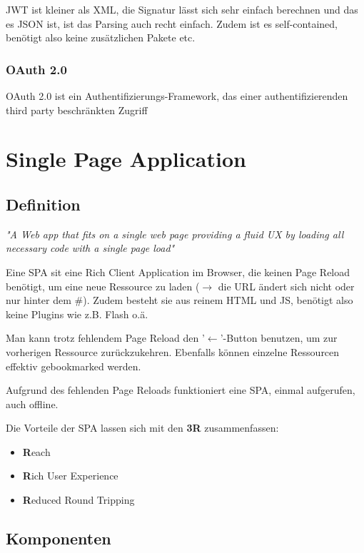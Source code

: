 \documentclass[a4paper, 11pt]{article}
\begin{document}
\vspace{10px}

\noindent JWT ist kleiner als XML, die Signatur lässt sich sehr einfach berechnen und das es JSON ist, ist das Parsing auch recht einfach. Zudem ist es self-contained, benötigt also keine zusätzlichen Pakete etc.

\subsubsection{OAuth 2.0}
OAuth 2.0 ist ein Authentifizierungs-Framework, das einer authentifizierenden third party beschränkten Zugriff 

\section{Single Page Application}
\subsection{Definition}
\begin{center}
	\textit{"A Web app that fits on a single web page providing a fluid UX by loading all necessary code with a single page load"}
\end{center}

\noindent Eine SPA sit eine Rich Client Application im Browser, die keinen Page Reload benötigt, um eine neue Ressource zu laden ($\rightarrow$ die URL ändert sich nicht oder nur hinter dem \#). Zudem besteht sie aus reinem HTML und JS, benötigt also keine Plugins wie z.B. Flash o.ä.

Man kann trotz fehlendem Page Reload den '$\leftarrow$'-Button benutzen, um zur vorherigen Ressource zurückzukehren. Ebenfalls können einzelne Ressourcen effektiv gebookmarked werden.

Aufgrund des fehlenden Page Reloads funktioniert eine SPA, einmal aufgerufen, auch offline.
\vspace{10px}

\noindent Die Vorteile der SPA lassen sich mit den \textbf{3R} zusammenfassen:
\begin{itemize}
	\item \textbf{R}each
	\item \textbf{R}ich User Experience
	\item \textbf{R}educed Round Tripping
\end{itemize}

\subsection{Komponenten}
\end{document}
